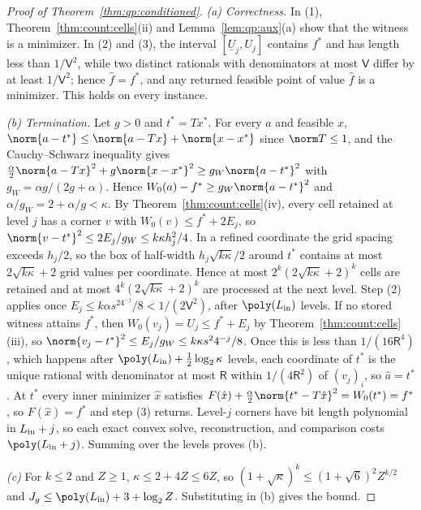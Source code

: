 \begin{proof}[Proof of Theorem~\ref{thm:qp:conditioned}]
\emph{(a) Correctness.} In (1), Theorem~\ref{thm:count:cells}(ii) and
Lemma~\ref{lem:qp:aux}(a) show that the witness is a minimizer. In (2) and (3),
the interval $[\underline U_j,U_j]$ contains $f^*$ and has length less than
$1/\mathsf V^2$, while two distinct rationals with denominators at most
$\mathsf V$ differ by at least $1/\mathsf V^2$; hence $\hat f=f^*$, and any
returned feasible point of value $\hat f$ is a minimizer. This holds on every
instance.

\emph{(b) Termination.} Let $g>0$ and $t^*=Tx^*$. For every $a$ and feasible
$x$, $\norm{a-t^*}\le\norm{a-Tx}+\norm{x-x^*}$ since $\norm T\le1$, and the
Cauchy--Schwarz inequality gives
$\frac\alpha2\norm{a-Tx}^2+g\norm{x-x^*}^2\ge g_W\norm{a-t^*}^2$ with
$g_W=\alpha g/(2g+\alpha)$. Hence $W_0(a)-f^*\ge g_W\norm{a-t^*}^2$ and
$\alpha/g_W=2+\alpha/g<\kappa$. By Theorem~\ref{thm:count:cells}(iv), every
cell retained at level $j$ has a corner $v$ with $W_0(v)\le f^*+2E_j$, so
$\norm{v-t^*}^2\le2E_j/g_W\le k\kappa h_j^2/4$. In a refined coordinate the
grid spacing exceeds $h_j/2$, so the box of half-width $h_j\sqrt{k\kappa}/2$
around $t^*$ contains at most $2\sqrt{k\kappa}+2$ grid values per coordinate.
Hence at most $2^k(2\sqrt{k\kappa}+2)^k$ cells are retained and at most
$4^k(2\sqrt{k\kappa}+2)^k$ are processed at the next level. Step (2) applies
once $E_j\le k\alpha s^24^{-j}/8<1/(2\mathsf V^2)$, after $\poly(L_{\rm in})$
levels. If no stored witness attains $f^*$, then
$W_0(v_j)=U_j\le f^*+E_j$ by Theorem~\ref{thm:count:cells}(iii), so
$\norm{v_j-t^*}^2\le E_j/g_W\le k\kappa s^24^{-j}/8$. Once this is less than
$1/(16\mathsf R^4)$, which happens after $\poly(L_{\rm in})+\frac12\log_2\kappa$
levels, each coordinate of $t^*$ is the unique rational with denominator at
most $\mathsf R$ within $1/(4\mathsf R^2)$ of $(v_j)_i$, so $\hat a=t^*$. At
$t^*$ every inner minimizer $\hat x$ satisfies
$F(\hat x)+\frac\alpha2\norm{t^*-T\hat x}^2=W_0(t^*)=f^*$, so $F(\hat x)=f^*$ and
step (3) returns. Level-$j$ corners have bit length polynomial in
$L_{\rm in}+j$, so each exact convex solve, reconstruction, and comparison
costs $\poly(L_{\rm in}+j)$. Summing over the levels proves (b).

\emph{(c)} For $k\le2$ and $Z\ge1$, $\kappa\le2+4Z\le6Z$, so
$(1+\sqrt\kappa)^k\le(1+\sqrt6)^2Z^{k/2}$ and
$J_g\le\poly(L_{\rm in})+3+\log_2Z$. Substituting in (b) gives the bound.
\end{proof}

